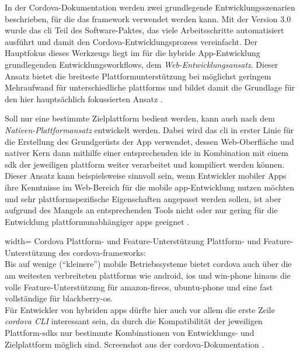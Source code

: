 
In der Cordova-Dokumentation werden zwei grundlegende Entwicklungsszenarien beschrieben, für die das \gls{framework} verwendet werden kann. 
Mit der Version 3.0 wurde das \gls{cli} Teil des Software-Paktes, das viele Arbeitsschritte automatisiert ausführt und damit den Cordova-Entwicklungsprozess vereinfacht. 
Der Hauptfokus dieses Werkzeugs liegt im für die hybride App-Entwicklung grundlegenden Entwicklungsworkflows, dem \emph{Web-Ent\-wick\-lungs\-an\-satz}.
Dieser Ansatz bietet die breiteste Plattformunterstützung bei möglichst geringem Mehraufwand für unterschiedliche \glspl{plattform} und bildet damit die Grundlage für den hier hauptsächlich fokussierten Ansatz \cite{Cordova-Docs_CLI}.

Soll nur eine bestimmte Zielplattform bedient werden, kann auch nach dem \emph{Nativen-Plattformansatz} entwickelt werden.
Dabei wird das \gls{cli} in erster Linie für die Erstellung des Grundgerüsts der App verwendet, dessen Web-Oberfläche und nativer Kern dann mithilfe einer entsprechenden \gls{ide} in Kombination mit einem \gls{sdk} der jeweiligen \gls{plattform} weiter verarbeitet und kompiliert werden können. 
Dieser Ansatz kann beispielsweise sinnvoll sein, wenn Entwickler mobiler Apps ihre Kenntnisse im Web-Bereich für die mobile \gls{app}-Entwicklung nutzen möchten und sehr plattformspezifische Eigenschaften angepasst werden sollen, ist aber aufgrund des Mangels an entsprechenden Tools nicht oder nur gering für die Entwicklung plattformunabhängiger \glspl{app} geeignet \cite{Cordova-Docs_CLI}. 


	{width=\fullimagesize}
	{Cordova Plattform- und Feature-Unterstützung}
		{Plattform- und Feature-Unterstützung des \gls{cordova}-\glspl{framework}: \\ 
		Bis auf wenige (\enquote{kleinere}) mobile Betriebssysteme bietet \gls{cordova} auch über die am weitesten verbreiteten \glspl{plattform} wie \gls{android}, \gls{ios} und \gls{win-phone} hinaus die volle Feature-Unterstützung für \gls{amazon-fireos}, \gls{ubuntu-phone} und eine fast vollständige für \gls{blackberry-os}.\\
		Für Entwickler von hybriden \glspl{app} dürfte hier auch vor allem die erste Zeile \emph{cordova CLI} interessant sein, da durch die Kompatibilität der jeweiligen Plattform-\glspl{sdk} nur bestimmte Kombinationen von Entwicklungs- und Zielplattform möglich sind.}
	{Screenshot aus der \gls{cordova}-Dokumentation \cite{Cordova-Docs_Platform-Support}.}


